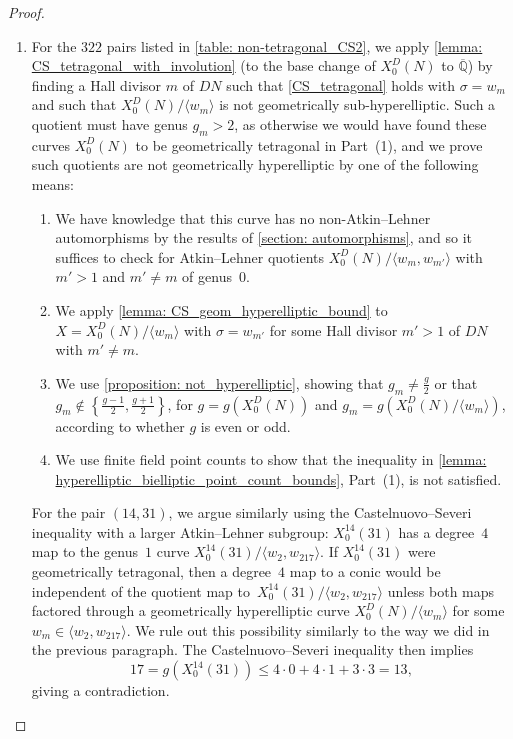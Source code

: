 \documentclass[11pt,reqno]{amsart}
\theoremstyle{definition}
\begin{document}
\begin{proof}
\begin{enumerate}
    \item For the $322$ pairs listed in \cref{table: non-tetragonal_CS2}, we apply \cref{lemma: CS_tetragonal_with_involution} (to the base change of $X_0^D(N)$ to $\overline{\mathbb{Q}}$) by finding a Hall divisor $m$ of $DN$ such that \cref{CS_tetragonal} holds with $\sigma = w_m$ and such that $X_0^D(N)/\langle w_m \rangle$ is not geometrically sub-hyperelliptic. Such a quotient must have genus $g_m > 2$, as otherwise we would have found these curves $X_0^D(N)$ to be geometrically tetragonal in Part~(1), and we prove such quotients are not geometrically hyperelliptic by one of the following means:
    \begin{enumerate}
        \item We have knowledge that this curve has no non-Atkin--Lehner automorphisms by the results of \cref{section: automorphisms}, and so it suffices to check for Atkin--Lehner quotients $X_0^D(N)/\langle w_m,w_{m'}\rangle$ with $m'>1$ and $m' \neq m$ of genus~$0$. 
        \item We apply \cref{lemma: CS_geom_hyperelliptic_bound} to $X = X_0^D(N)/\langle w_m \rangle$ with $\sigma = w_{m'}$ for some Hall divisor $m' > 1$ of $DN$ with $m' \neq m$.
        \item We use \cref{proposition: not_hyperelliptic}, showing that $g_m \neq \frac{g}{2}$ or that $g_m \not\in\left\{\frac{g-1}{2}, \frac{g + 1}{2}\right\}$, for $g=g(X_0^D(N))$ and $g_m = g\left(X_0^D(N)/\langle w_m \rangle\right)$, according to whether $g$ is even or odd.
        \item We use finite field point counts to show that the inequality in \cref{lemma: hyperelliptic_bielliptic_point_count_bounds}, Part~(1), is not satisfied.
    \end{enumerate}
    
    For the pair $(14,31)$, we argue similarly using the Castelnuovo--Severi inequality with a larger Atkin--Lehner subgroup: $X_0^{14}(31)$ has a degree~$4$ map to the genus~$1$ curve $X_0^{14}(31)/\langle w_{2}, w_{217} \rangle$. If $X_0^{14}(31)$ were geometrically tetragonal, then a degree~$4$ map to a conic would be independent of the quotient map to~$X_0^{14}(31)/\langle w_{2}, w_{217} \rangle$ unless both maps factored through a geometrically hyperelliptic curve $X_0^D(N)/\langle w_m \rangle$ for some $w_m \in \langle w_{2}, w_{217} \rangle$. We rule out this possibility similarly to the way we did in the previous paragraph. The Castelnuovo--Severi inequality then implies
    \[ 17 = g(X_0^{14}(31)) \leq 4 \cdot 0 + 4 \cdot 1 + 3 \cdot 3 = 13, \]
    giving a contradiction.
    

\end{enumerate}
\end{proof}
\end{document}
